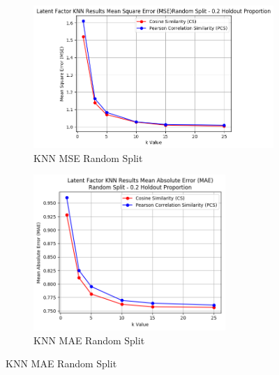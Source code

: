 \documentclass[10pt]{article}
\begin{document}
\begin{figure}[t]
    \centering
    \begin{subfigure}{0.5\textwidth}
      \centering
      \includegraphics[width=1\textwidth]{KNN_MSE_Random_Split}
      \caption{KNN MSE Random Split}
      \label{fig:knn1}
    \end{subfigure}%
    \begin{subfigure}{0.5\textwidth}
      \centering
      \includegraphics[width=0.8\textwidth]{KNN_MAE_Random_Split}
      \caption{KNN MAE Random Split}
      \label{fig:knn2}
    \end{subfigure}
\end{figure}
\end{document}
